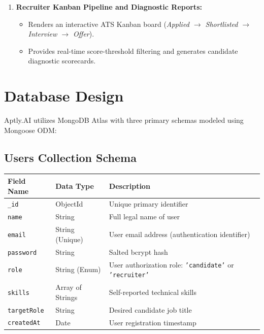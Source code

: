 \documentclass[12pt, a4paper]{article}
\begin{document}
\begin{enumerate}[label=\textbf{Module \arabic* --}, leftmargin=2em, itemsep=5pt]
    \item \textbf{Recruiter Kanban Pipeline and Diagnostic Reports:}
    \begin{itemize}[leftmargin=1.2em]
        \item Renders an interactive ATS Kanban board (\textit{Applied $\rightarrow$ Shortlisted $\rightarrow$ Interview $\rightarrow$ Offer}).
        \item Provides real-time score-threshold filtering and generates candidate diagnostic scorecards.
    \end{itemize}
\end{enumerate}

\newpage

\section{Database Design}
Aptly.AI utilizes MongoDB Atlas with three primary schemas modeled using Mongoose ODM:

\subsection{Users Collection Schema}
\begin{center}
\renewcommand{\arraystretch}{1.15}
\begin{tabularx}{\textwidth}{l p{3.2cm} X}
\toprule
\textbf{\color{primary}Field Name} & \textbf{\color{primary}Data Type} & \textbf{\color{primary}Description} \\
\midrule
\texttt{\_id} & ObjectId & Unique primary identifier \\
\texttt{name} & String & Full legal name of user \\
\texttt{email} & String (Unique) & User email address (authentication identifier) \\
\texttt{password} & String & Salted bcrypt hash \\
\texttt{role} & String (Enum) & User authorization role: \texttt{'candidate'} or \texttt{'recruiter'} \\
\texttt{skills} & Array of Strings & Self-reported technical skills \\
\texttt{targetRole} & String & Desired candidate job title \\
\texttt{createdAt} & Date & User registration timestamp \\
\bottomrule
\end{tabularx}
\end{center}
\end{document}

